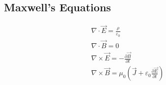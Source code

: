 \documentclass[10pt]{article}
\begin{document}
\begin{multicols*}{5}
\section{Maxwell's Equations}

\begin{gather*}
    \nabla \cdot \vec{E} = \frac{\rho}{\varepsilon_0}\\
    \nabla \cdot \vec{B} = 0\\
    \nabla \times \vec{E} = -\frac{\partial \vec{B}}{\partial t}\\
    \nabla \times \vec{B} = \mu_0 \left({\vec{J} + \varepsilon_0
	    \frac{\partial \vec{E}}{\partial t}}\right)
\end{gather*}

\end{multicols*}
\newpage
\end{document}
